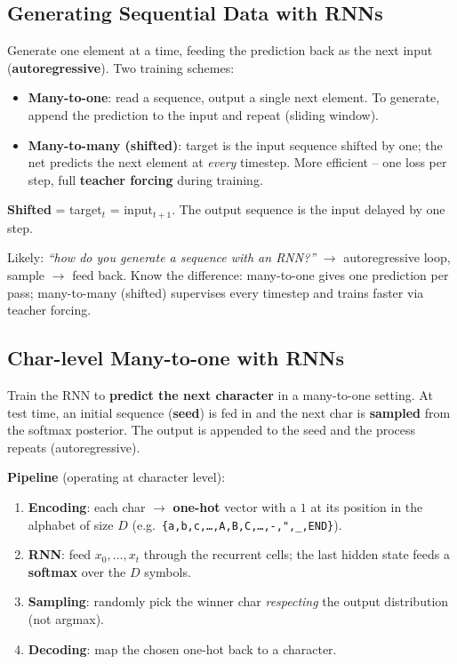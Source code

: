\documentclass[10pt,a4paper]{article}
\begin{document}
	\subsection{Generating Sequential Data with RNNs}

	Generate one element at a time, feeding the prediction back as the next input (\textbf{autoregressive}). Two training schemes:

	\begin{itemize}[leftmargin=*]
		\item \textbf{Many-to-one}: read a sequence, output a single next element. To generate, append the prediction to the input and repeat (sliding window).
		\item \textbf{Many-to-many (shifted)}: target is the input sequence shifted by one; the net predicts the next element at \emph{every} timestep. More efficient -- one loss per step, full \textbf{teacher forcing} during training.
	\end{itemize}

	\begin{importantbox}
		\textbf{Shifted} = target$_t$ = input$_{t+1}$. The output sequence is the input delayed by one step.
	\end{importantbox}

	\begin{examtipbox}
		Likely: \emph{``how do you generate a sequence with an RNN?''} $\rightarrow$ autoregressive loop, sample $\rightarrow$ feed back. Know the difference: many-to-one gives one prediction per pass; many-to-many (shifted) supervises every timestep and trains faster via teacher forcing.
	\end{examtipbox}

	\subsection{Char-level Many-to-one with RNNs}

	\begin{definitionbox}
		Train the RNN to \textbf{predict the next character} in a many-to-one setting. At test time, an initial sequence (\textbf{seed}) is fed in and the next char is \textbf{sampled} from the softmax posterior. The output is appended to the seed and the process repeats (autoregressive).
	\end{definitionbox}

	\textbf{Pipeline} (operating at character level):
	\begin{enumerate}[leftmargin=*]
		\item \textbf{Encoding}: each char $\rightarrow$ \textbf{one-hot} vector with a $1$ at its position in the alphabet of size $D$ (e.g.\ \texttt{\{a,b,c,\dots,A,B,C,\dots,-,",\_,END\}}).
		\item \textbf{RNN}: feed $x_0,\dots,x_t$ through the recurrent cells; the last hidden state feeds a \textbf{softmax} over the $D$ symbols.
		\item \textbf{Sampling}: randomly pick the winner char \emph{respecting} the output distribution (not argmax).
		\item \textbf{Decoding}: map the chosen one-hot back to a character.
	\end{enumerate}
\end{document}
